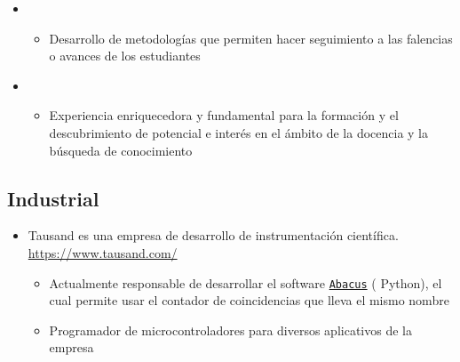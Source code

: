 \documentclass[11pt, letterpaper, sans]{moderncv}        %
\begin{document}
\begin{itemize}
{{\begin{itemize}
					\end{itemize} 
				}
			}
			\vspace{6pt}
			\item
			{
				{
					\vspace{3pt}
					\begin{itemize}
						\item Desarrollo de metodologías que permiten hacer seguimiento a las falencias o avances de los estudiantes
					\end{itemize}
				}
			}
			\vspace{6pt}
			
			\item{
				{
					\vspace{3pt}
					\begin{itemize}
						\item Experiencia enriquecedora y fundamental para la formaci\'on y el descubrimiento de potencial e inter\'es en el \'ambito de la docencia y la b\'usqueda de conocimiento
					\end{itemize}
				}
			}
		\end{itemize}
	\vspace{6pt}
	\subsection{Industrial}
		\begin{itemize}
			\item
			{
				{
					Tausand es una empresa de desarrollo de instrumentación científica. \url{https://www.tausand.com/}
					\vspace{3pt}
					\begin{itemize}
						\item Actualmente responsable de desarrollar el software \href{https://www.tausand.com/downloads/}{\texttt{Abacus}} ({\color{blue} Python}), el cual permite usar el contador de coincidencias que lleva el mismo nombre
						\item Programador de microcontroladores para diversos aplicativos de la empresa
					\end{itemize}
				}
			}
			\vspace{6pt}
		\end{itemize}
\end{document}
